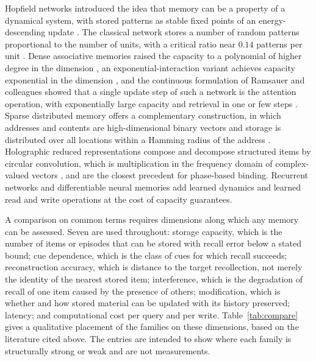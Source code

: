 Hopfield networks introduced the idea that memory can be a property of a dynamical system, with stored patterns as stable fixed points of an energy-descending update \cite{hopfield1982}. The classical network stores a number of random patterns proportional to the number of units, with a critical ratio near $0.14$ patterns per unit \cite{amit1985}. Dense associative memories raised the capacity to a polynomial of higher degree in the dimension \cite{krotov2016}, an exponential-interaction variant achieves capacity exponential in the dimension \cite{demircigil2017}, and the continuous formulation of Ramsauer and colleagues showed that a single update step of such a network is the attention operation, with exponentially large capacity and retrieval in one or few steps \cite{ramsauer2021}. Sparse distributed memory offers a complementary construction, in which addresses and contents are high-dimensional binary vectors and storage is distributed over all locations within a Hamming radius of the address \cite{kanerva1988}. Holographic reduced representations compose and decompose structured items by circular convolution, which is multiplication in the frequency domain of complex-valued vectors \cite{plate1995}, and are the closest precedent for phase-based binding. Recurrent networks and differentiable neural memories add learned dynamics and learned read and write operations at the cost of capacity guarantees.

A comparison on common terms requires dimensions along which any memory can be assessed. Seven are used throughout: storage capacity, which is the number of items or episodes that can be stored with recall error below a stated bound; cue dependence, which is the class of cues for which recall succeeds; reconstruction accuracy, which is distance to the target recollection, not merely the identity of the nearest stored item; interference, which is the degradation of recall of one item caused by the presence of others; modification, which is whether and how stored material can be updated with its history preserved; latency; and computational cost per query and per write. Table~\ref{tab:compare} gives a qualitative placement of the families on these dimensions, based on the literature cited above. The entries are intended to show where each family is structurally strong or weak and are not measurements.

